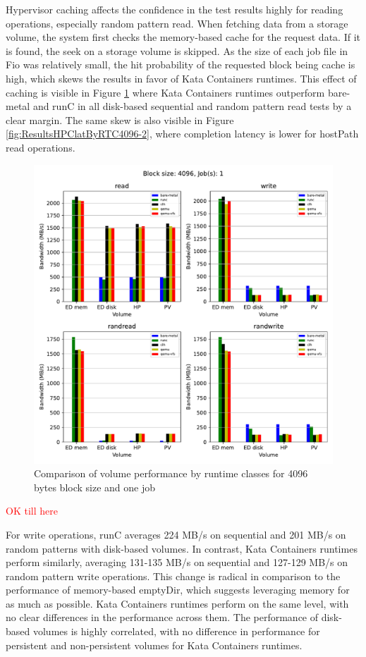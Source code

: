 Hypervisor caching affects the confidence in the test results highly for reading operations, especially random pattern read. When fetching data from a storage volume, the system first checks the memory-based cache for the request data. If it is found, the seek on a storage volume is skipped. As the size of each job file in Fio was relatively small, the hit probability of the requested block being cache is high, which skews the results in favor of Kata Containers runtimes. This effect of caching is visible in Figure \ref{fig:ResultsVolumeByRTC4096-1} where Kata Containers runtimes outperform bare-metal and runC in all disk-based sequential and random pattern read tests by a clear margin. The same skew is also visible in Figure \ref{fig:ResultsHPClatByRTC4096-2}, where completion latency is lower for hostPath read operations.

\begin{figure}[ht]
  \begin{center}
    \includegraphics[width=12cm]{results/subplot_bw_by_volume_with_bare(4096,1).pdf}
    \caption{Comparison of volume performance by runtime classes for 4096 bytes block size and one job}
    \label{fig:ResultsVolumeByRTC4096-1}
  \end{center}
\end{figure}

\textcolor{red}{OK till here}

For write operations, runC averages 224 MB/s on sequential and 201 MB/s on random patterns with disk-based volumes. In contrast, Kata Containers runtimes perform similarly, averaging 131-135 MB/s on sequential and 127-129 MB/s on random pattern write operations. This change is radical in comparison to the performance of memory-based emptyDir, which suggests leveraging memory for as much as possible. Kata Containers runtimes perform on the same level, with no clear differences in the performance across them. The performance of disk-based volumes is highly correlated, with no difference in performance for persistent and non-persistent volumes for Kata Containers runtimes.
    
